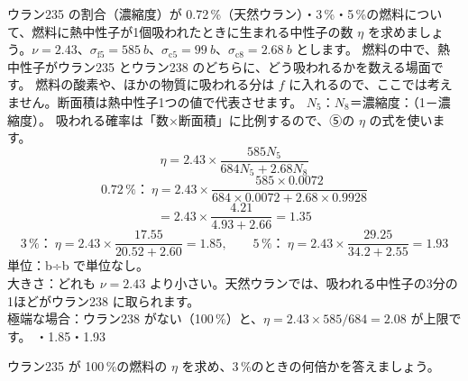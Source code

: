 \label{ph:原-15:ex4}
\begin{phreidai}
ウラン235 の割合（濃縮度）が 0.72\,\%（天然ウラン）・3\,\%・5\,\%の燃料について、燃料に熱中性子が1個吸われたときに生まれる中性子の数 $\eta$ を求めましょう。$\nu=2.43$、$\sigma_{\mathrm f5}=\qty{585}{b}$、$\sigma_{\mathrm c5}=\qty{99}{b}$、$\sigma_{\mathrm c8}=\qty{2.68}{b}$ とします。
\phbamen
燃料の中で、熱中性子がウラン235 とウラン238 のどちらに、どう吸われるかを数える場面です。
\phmushi
燃料の酸素や、ほかの物質に吸われる分は $f$ に入れるので、ここでは考えません。断面積は熱中性子1つの値で代表させます。
\phzu
$N_5$：$N_8$＝濃縮度：（1－濃縮度）。
\phriyu
吸われる確率は「数×断面積」に比例するので、⑤の $\eta$ の式を使います。
\phtateru
\[ \eta=2.43\times\frac{585N_5}{684N_5+2.68N_8} \]
\phtoku
\[ 0.72\,\%：\ \eta=2.43\times\frac{585\times0.0072}{684\times0.0072+2.68\times0.9928} \]
\[ =2.43\times\frac{4.21}{4.93+2.66}=1.35 \]
\[ 3\,\%：\ \eta=2.43\times\frac{17.55}{20.52+2.60}=1.85,\qquad 5\,\%：\ \eta=2.43\times\frac{29.25}{34.2+2.55}=1.93 \]
\phtashikame
単位：b÷b で単位なし。\\
大きさ：どれも $\nu=2.43$ より小さい。天然ウランでは、吸われる中性子の3分の1ほどがウラン238 に取られます。\\
極端な場合：ウラン238 がない（100\,\%）と、$\eta=2.43\times585/684=2.08$ が上限です。
・1.85・1.93
\end{phreidai}
\begin{jibun}
ウラン235 が 100\,\%の燃料の $\eta$ を求め、3\,\%のときの何倍かを答えましょう。
\end{jibun}

